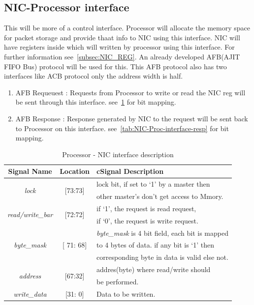 \documentclass[12pt]{report}
\begin{document}
		\subsection{NIC-Processor interface}
			This will be more of a control interface. Processor will allocate the memory space for packet storage and provide thaat info to NIC using this interface.
			NIC will have registers inside which will written by processor using this interface. For further information see~\ref{subsec:NIC_REG}. An already developed
			AFB(AJIT FIFO Bus) protocol will be used for this. This AFB protocol also has two interfaces like ACB protocol only the address width is half.

			\begin{enumerate}
				\item AFB Requeuest : Requests from Processor to write or read the NIC reg will be sent through this interface. see~\ref{tab:Proc-NIC-interface-req} for bit mapping.
				\item AFB Response : Response generated by NIC to the request will be sent back to Processor on this interface. see~\ref{tab:NIC-Proc-interface-resp} for bit mapping.
			\end{enumerate}

				\begin{table}[h]
					\centering
					\begin{tabular}{ccl}
						\hline
						\textbf{Signal Name} 			& \textbf{Location} 		&{c}\textbf{Signal Description}  \\ \hline
						\multirow{2}{*}{\textit{lock}}		& \multirow{2}{*}{[73:73]}	& lock bit, if set to `1' by a master then\\
											&				& other master's don't get access to Mmory.\\ \hline
						\multirow{2}{*}{\textit{read/write\_bar}}& \multirow{2}{*}{[72:72]}	& if `1', the request is read request,\\ 
											& 				& if `0', the request is write request.\\ \hline
						\multirow{3}{*}{\textit{byte\_mask}}	& \multirow{3}{*}{[ 71: 68]}	& \textit{byte\_mask} is 4 bit field, each bit is mapped\\
											&				& to 4 bytes of data. if any bit is `1' then\\
											& 				& corresponding byte in data is valid else not.\\ \hline 
						\multirow{2}{*}{\textit{address}}   	& \multirow{2}{*}{[67:32]} 	& addres(byte) where read/write should\\ 
											&				& be performed.\\ \hline
						\textit{write\_data}   			& [31: 0] 			& Data to be written.\\ \hline
					\end{tabular}
					\caption{Processor - NIC interface description}
					\label{tab:Proc-NIC-interface-req}
				\end{table}
\end{document}
